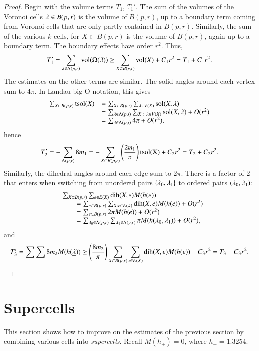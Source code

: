 \begin{proof}
Begin with the volume terms $T_1$, $T_1'$.  The sum of the volumes of the Voronoi cells $\lambda\in B(p,r)$ is the volume of $B(p,r)$, up to a boundary term coming from Voronoi cells that are only partly contained in $B(p,r)$.  Similarly, the sum of the various $k$-cells, for $X\subset B(p,r)$ is the volume of $B(p,r)$, again up to a boundary term. The boundary effects have order $r^2$. Thus,
$$
T_1'= \sum_{\lambda\in \Lambda(p,r)} {\operatorname{vol}}(\Omega(\lambda)) \ge \sum_{X\subset B(p,r)} {\operatorname{vol}}(X) + C_1 r^2 = T_1 + C_1 r^2.
$$
The estimates on the other terms are similar.  The solid angles
around each vertex sum to $4\pi$.
In Landau big O notation, this gives
$$
\begin{array}{lll}
\sum_{X\subset B(p,r)} {\operatorname{tsol}}(X) &= 
\sum_{X\subset B(p,r)} \sum_{\lambda\in V(X)} \operatorname{sol}(X,\lambda)\\
 &=\sum_{\lambda\in \Lambda(p,r)} \sum_{X\ :\  \lambda\in V(X)} \operatorname{sol}(X,\lambda) + O(r^2)\\
 &=\sum_{\lambda\in \Lambda(p,r)} 4\pi    + O(r^2),
\end{array}
$$
hence
$$
T_2' = -\sum_{\Lambda(p,r)} 8 m_1 = -\sum_{X\subset B(p,r)}\left(\frac{2m_1}\pi\right) {\operatorname{tsol(X)}} + C_2 r^2 = T_2 + C_2 r^2.
$$
Similarly, the dihedral angles around each edge sum to $2\pi$.  There is a factor of $2$ that enters when switching from unordered pairs $\{\lambda_0,\lambda_1\}$ to ordered pairs $(\lambda_0,\lambda_1)$:
$$
\begin{array}{lll}
&\sum_{X\subset B(p,r)} \sum_{e\in E(X)} \operatorname{dih}(X,e)  M(h(e)) \\
&\qquad=\sum_{e\subset B(p,r)} \sum_{X: e\in E(X)} \operatorname{dih}(X,e)  M(h(e)) +O(r^2)\\
 &\qquad=\sum_{e\subset B(p,r)} 2\pi M(h(e)) + O(r^2) \\
 &\qquad=\sum_{\lambda_0\in \Lambda(p,r)} \sum_{\lambda_1\in \Lambda(p,r) } \pi M(h(\lambda_0,\lambda_1)) + O(r^2),\\
\end{array}
$$
and 
$$
T_3' = \sum\sum 8 m_2 M(h({\underline{\lambda}})) \ge \left(\frac{8m_2}\pi\right)
\sum_{X\subset B(p,r)}\sum_{e\in E(X)}\operatorname{dih}(X,e) M(h(e)) + C_3 r^2 = T_3 + C_3 r^2.
$$
\end{proof}




\section{Supercells}

This section shows how to improve on the estimates of the previous section
by combining various cells into {\it supercells}.
Recall $M(h_+) = 0$, where   $h_+ = 1.3254$.

